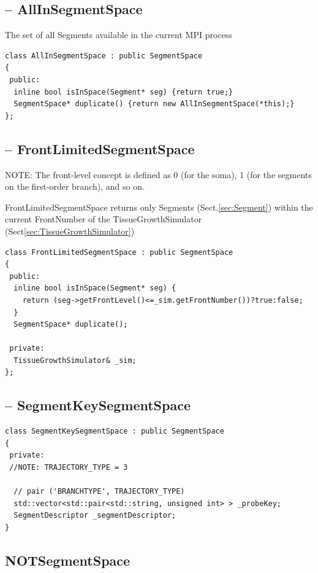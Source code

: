 \subsection{-- AllInSegmentSpace}
\label{sec:AllInSegmentSpace}

The set of all Segments available in the current MPI process

\begin{verbatim}
class AllInSegmentSpace : public SegmentSpace
{
 public:
  inline bool isInSpace(Segment* seg) {return true;}
  SegmentSpace* duplicate() {return new AllInSegmentSpace(*this);}
};
\end{verbatim}

\subsection{-- FrontLimitedSegmentSpace}
\label{sec:FrontLimitedSegmentSpace}

NOTE: The front-level concept is defined as 0 (for the soma),
1 (for the segments on the first-order branch), and so on.

FrontLimitedSegmentSpace returns only Segments (Sect.\ref{sec:Segment}) within the current
FrontNumber of the TissueGrowthSimulator (Sect\ref{sec:TissueGrowthSimulator})
\begin{verbatim}
class FrontLimitedSegmentSpace : public SegmentSpace
{
 public:
  inline bool isInSpace(Segment* seg) {
    return (seg->getFrontLevel()<=_sim.getFrontNumber())?true:false;
  }
  SegmentSpace* duplicate();
  
 private:
  TissueGrowthSimulator& _sim;
};
\end{verbatim}

\subsection{-- SegmentKeySegmentSpace}
\label{sec:SegmentKeySegmentSpace}

\begin{verbatim}
class SegmentKeySegmentSpace : public SegmentSpace
{
 private:
 //NOTE: TRAJECTORY_TYPE = 3
 
  // pair ('BRANCHTYPE', TRAJECTORY_TYPE)
  std::vector<std::pair<std::string, unsigned int> > _probeKey;
  SegmentDescriptor _segmentDescriptor;
}
\end{verbatim}


\subsection{NOTSegmentSpace}
\label{sec:NOTSegmentSpace}


